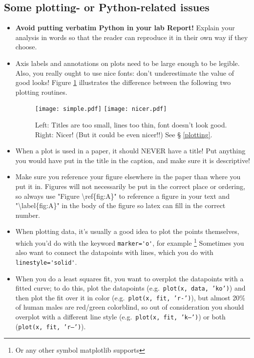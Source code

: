 \documentclass[12pt,preprint]{aastex}
\begin{document}
\subsection{Some plotting- or Python-related issues} \begin{itemize}
    \item \textbf{Avoid putting verbatim Python in your lab Report!} Explain your analysis in words so that the reader can reproduce it in their own way if they choose.
	\item Axis labels and annotations on plots need to be large
enough to be legible.  Also, you really ought to use nice fonts: don't
underestimate the value of good looks! Figure \ref{simple} illustrates
the difference between the following two plotting routines.





\begin{figure}[b!]
\begin{center} 
\texttt{[image: simple.pdf]}
\texttt{[image: nicer.pdf]}
\end{center}
\caption{Left: Titles are too small, lines too thin, font doesn't look
good. Right: Nicer! (But it could be even nicer!!) See \S
\ref{plotting}.  \label{simple}}
\end{figure}

\item When a plot is used in a paper, it should NEVER have a title! Put anything you would have put in the title in the caption, and make sure it is descriptive!

\item Make sure you reference your figure elsewhere in the paper than where you put it in. Figures will not necessarily be put in the correct place or ordering, so always use "Figure \textbackslash ref\{fig:A\}" to reference a figure in your text and "\textbackslash label\{fig:A\}" in the body of the figure so latex can fill in the correct number.

\item When plotting data, it's usually a good idea to plot the
  points themselves, which you'd do with the keyword \verb$marker='o'$, for
  example \footnote{Or any other symbol matplotlib supports}
    Sometimes you also want to connect the datapoints
  with lines, which you do with \verb$linestyle='solid'$.

\item When you do a least squares fit, you want to overplot the
  datapoints with a fitted curve; to do this, plot the datapoints
  (e.g.\ {\tt plot(x, data, 'ko')}) and then plot the fit over it
  in color (e.g.\ {\tt plot(x, fit, 'r-')}), but almost 20\% of human males are red/green
  colorblind, so out of consideration you should overplot with a
  different line style (e.g.\ {\tt plot(x, fit, 'k--')}) or both
  ({\tt plot(x, fit, 'r--')}).


\end{itemize}
\end{document}
